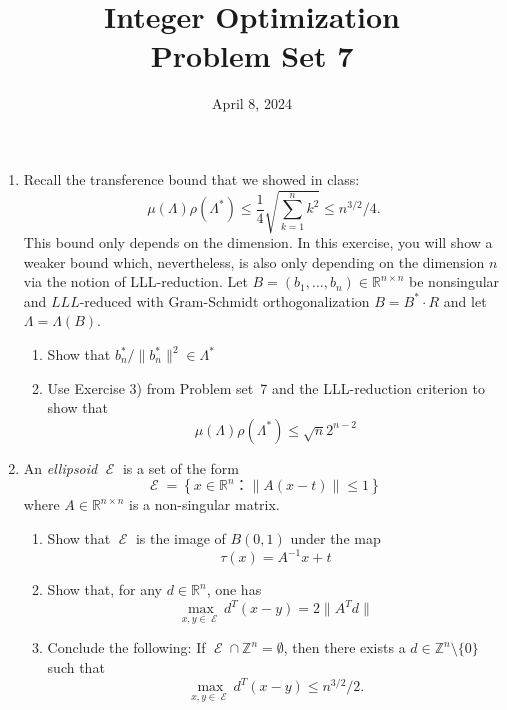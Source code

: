 \documentclass[11pt,a4paper]{article}
\title{Integer Optimization  \\ Problem Set 7 }
\date{ April 8, 2024}
\DeclareMathOperator{\E}{\mathcal{E}}
\begin{document}
\maketitle 


\begin{enumerate}

\item Recall the transference bound that we showed in class:
  \begin{displaymath}
    μ(Λ) ρ(Λ^*) ≤  \frac{1}{4} \sqrt{∑_{k=1}^n k^2} ≤ n^{3/2} / 4. 
  \end{displaymath}
  This bound only depends on the dimension. In this exercise, you will show a weaker bound which, nevertheless, is also only depending on the dimension $n$ via the notion of  LLL-reduction. Let $B = (b_1,\dots,b_n)∈ ℝ^{n ×n}$ be nonsingular and $LLL$-reduced with Gram-Schmidt orthogonalization $ B = B^* ⋅ R$ and let $Λ = Λ(B)$. 
  \begin{enumerate}
  \item  Show that $b_n^* / \|b_n^*\|^2 ∈ Λ^*$
  \item Use Exercise 3) from Problem set~7  and the LLL-reduction criterion to show that
    \begin{displaymath}
       μ(Λ) ρ(Λ^*) ≤\sqrt{n} 2^{n-2} 
    \end{displaymath}
  \end{enumerate}
  

\item An \emph{ellipsoid} $\E$ is a set of the form
  \begin{displaymath}
    \E = \left \{ x ∈ ℝ^n ： \| A (x  - t) \| ≤1 \right\} 
    \end{displaymath}
    where $A ∈ ℝ^{n ×n}$ is a non-singular matrix.
    \begin{enumerate}
    \item 
      Show that $\E$ is the image of $B(0,1)$ under the map
      \begin{displaymath}
        τ(x) = A^{-1} x + t
      \end{displaymath}
    \item Show that, for any $d ∈ ℝ^n$, one has
      \begin{displaymath}
        \max_{x,y ∈ \E} d^T(x - y) = 2 \|A^T d\| 
      \end{displaymath}
    \item Conclude the following: If $\E ∩ ℤ^n = ∅$, then there exists a $d ∈ ℤ^n \setminus \{0\}$ such that
      \begin{displaymath}
              \max_{x,y ∈ \E} d^T(x - y) ≤ n^{3/2}/2. 
      \end{displaymath}
    \end{enumerate}
    

\end{enumerate}
\end{document}
